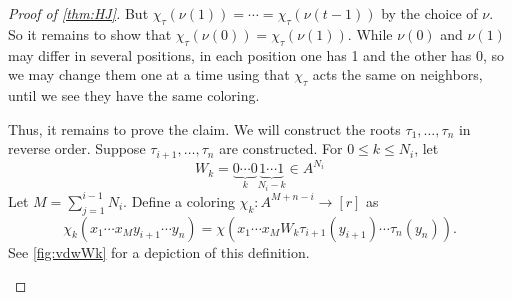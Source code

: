 \begin{proof}[Proof of \cref{thm:HJ}]
But $\chi_\tau(\nu(1)) = \dotsm = \chi_\tau(\nu(t-1))$ by the choice of $\nu$. So it remains to show that $\chi_\tau(\nu(0))=\chi_\tau(\nu(1))$.  While $\nu(0)$ and $\nu(1)$ may differ in several positions, in each position one has 1 and the other has 0, so we may change them one at a time using that $\chi_\tau$ acts the same on neighbors, until we see they have the same coloring.

Thus, it remains to prove the claim. We will construct the roots $\tau_1,\dotsc,\tau_n$ in reverse order.
Suppose $\tau_{i+1},\dotsc,\tau_n$ are constructed.
For $0\leq k\leq N_i$, let
\[
W_k = \underbrace{0\dotsm 0}_k \underbrace{1\dotsm 1}_{N_i-k}\in A^{N_i}
\]
Let $M = \sum_{j=1}^{i-1}N_i$. Define a coloring  $\chi_k : A^{M+ n-i} \to [r]$ as
\[
\chi_k(x_1 \dotsm x_M y_{i+1}\dotsm y_{n}) =  \chi(x_1\dotsm x_M W_k \tau_{i+1}(y_{i+1})\dotsm \tau_n(y_n)).
\]
See \cref{fig:vdwWk} for a depiction of this definition.
\begin{figure*}[ht]
\begin{center}
\end{center}
\end{figure*}
\end{proof}
